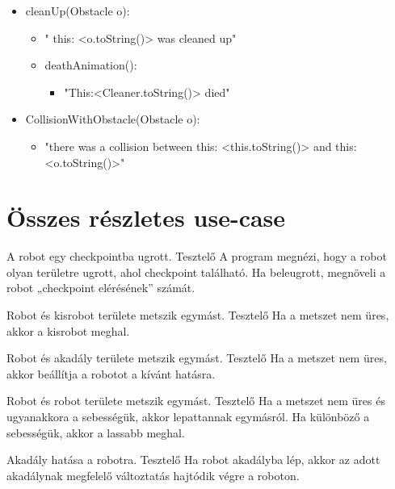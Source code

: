 \begin{itemize}
\begin{itemize}
\begin{itemize}
	        \end{itemize}
	 \item cleanUp(Obstacle o):     
	        \begin{itemize}
	        \item  " this: <o.toString()> was cleaned up"
	        
	 \item deathAnimation():
	        \begin{itemize}
	        \item  "This:<Cleaner.toString()> died"
	        
	        \end{itemize}
	        
	        \end{itemize}
\item CollisionWithObstacle(Obstacle o):     
	        \begin{itemize}
	        \item  "there was a collision between this: <this.toString()> and this: <o.toString()>"
	        
	        \end{itemize}
	        
	\end{itemize}
\end{itemize}
\newpage

\section{Összes részletes use-case}

{A robot egy checkpointba ugrott.}
{Tesztelő}
{A program megnézi, hogy a robot olyan területre ugrott, ahol checkpoint található. Ha beleugrott, megnöveli a robot „checkpoint elérésének” számát.}

{Robot és kisrobot területe metszik egymást.}
{Tesztelő}
{Ha a metszet nem üres, akkor a kisrobot meghal.}

{Robot és akadály területe metszik egymást.}
{Tesztelő}
{Ha a metszet nem üres, akkor beállítja a robotot a kívánt hatásra.}

{Robot és robot területe metszik egymást.}
{Tesztelő}
{Ha a metszet nem üres és ugyanakkora a sebességük, akkor lepattannak egymásról. Ha különböző a sebességük, akkor a lassabb meghal.
}

{Akadály hatása a robotra.}
{Tesztelő}
{Ha robot akadályba lép, akkor az adott akadálynak megfelelő változtatás hajtódik végre a roboton.}
\newpage

